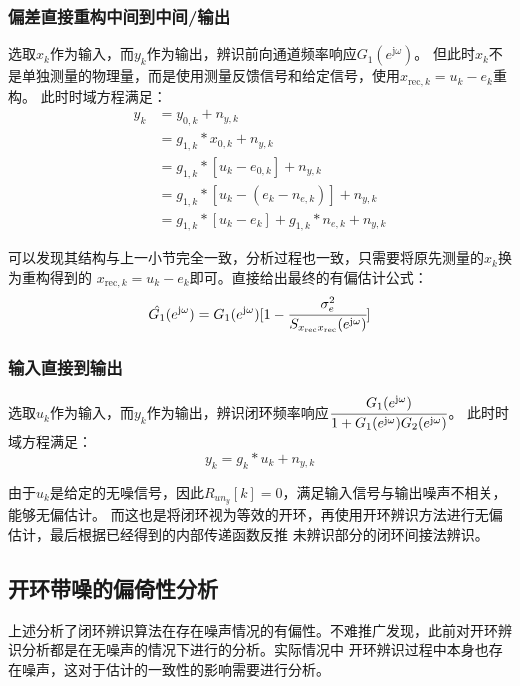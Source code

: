 \subsubsection{偏差直接重构中间到中间/输出}
选取\(x_k\)作为输入，而\(y_k\)作为输出，辨识前向通道频率响应\(G_1(e^{\mathrm{j}\omega})\)。
但此时\(x_k\)不是单独测量的物理量，而是使用测量反馈信号和给定信号，使用\(x_{\mathrm{rec},k}=u_k-e_k\)重构。
此时时域方程满足：
\begin{align*}
    y_k&=y_{0,k}+n_{y,k}\\
    &=g_{1,k}*x_{0,k}+n_{y,k}\\
    &=g_{1,k}*[u_k-e_{0,k}]+n_{y,k}\\
    &=g_{1,k}*[u_k-(e_k-n_{e,k})]+n_{y,k}\\
    &=g_{1,k}*[u_k-e_k]+g_{1,k}*n_{e,k}+n_{y,k}
\end{align*}

可以发现其结构与上一小节完全一致，分析过程也一致，只需要将原先测量的\(x_k\)换为重构得到的
\(x_{\mathrm{rec},k}=u_k-e_k\)即可。直接给出最终的有偏估计公式：
\begin{equation*}
    \hat{G_1}(e^{\mathrm{j}\omega})=G_1(e^{\mathrm{j}\omega})[1-\cfrac{\sigma_e^2}{S_{x_{\mathrm{rec}}x_{\mathrm{rec}}}(e^{\mathrm{j}\omega})}]
\end{equation*}

\subsubsection{输入直接到输出}
选取\(u_k\)作为输入，而\(y_k\)作为输出，辨识闭环频率响应\(\cfrac{G_1(e^{\mathrm{j}\omega})}{1+G_1(e^{\mathrm{j}\omega})G_2(e^{\mathrm{j}\omega})}\)。
此时时域方程满足：
\begin{equation*}
    y_k = g_k*u_k + n_{y,k}
\end{equation*}

由于\(u_k\)是给定的无噪信号，因此\(R_{un_y}[k]=0\)，满足输入信号与输出噪声不相关，能够无偏估计。
而这也是将闭环视为等效的开环，再使用开环辨识方法进行无偏估计，最后根据已经得到的内部传递函数反推
未辨识部分的闭环间接法辨识。

\subsection{开环带噪的偏倚性分析}
上述分析了闭环辨识算法在存在噪声情况的有偏性。不难推广发现，此前对开环辨识分析都是在无噪声的情况下进行的分析。实际情况中
开环辨识过程中本身也存在噪声，这对于估计的一致性的影响需要进行分析。

